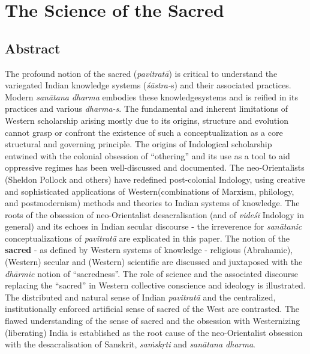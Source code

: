 
\chapter{The Science of the Sacred}\label{chapter9}



\section*{Abstract}

The profound notion of the sacred (\textit{pavitratā}) is critical to understand the variegated Indian knowledge systems (\textit{śāstra-}s) and their associated practices. Modern \textit{sanātana dharma } embodies these knowledge\break systems and is reified in its practices and various \textit{dharma-s}. The fundamental and inherent limitations of Western scholarship arising mostly due to its origins, structure and evolution cannot grasp or confront the existence of such a conceptualization as a core structural and governing principle. The origins of Indological scholarship entwined with the colonial obsession of “othering” and its use as a tool to aid oppressive regimes has been well-discussed and documented. The neo-Orientalists (Sheldon Pollock and others) have redefined post-colonial Indology, using creative and sophisticated applications of Western\break (combinations of Marxism, philology, and postmodernism) methods and theories to Indian systems of knowledge. The roots of the obsession of neo-Orientalist desacralisation (and of \textit{videśī} Indology in general) and its echoes in Indian secular discourse - the irreverence for \textit{sanātanic} conceptualizations of \textit{pavitratā} are explicated in this paper. The notion of the \textbf{sacred} - as defined by Western systems of knowledge - religious (Abrahamic), (Western) secular and (Western) scientific are discussed and juxtaposed with the \textit{dhārmic} notion of “sacredness”. The role of science and the associated discourse replacing the “sacred” in Western collective conscience and ideology is illustrated. The distributed and natural sense of Indian \textit{pavitratā} and the centralized, institutionally enforced artificial sense of sacred of the West are contrasted. The flawed understanding of the sense of sacred and the obsession with Westernizing (liberating) India is established as the root cause of the neo-Orientalist obsession with the desacralisation of Sanskrit, \textit{saṁskṛti} and \textit{sanātana dharma}.


